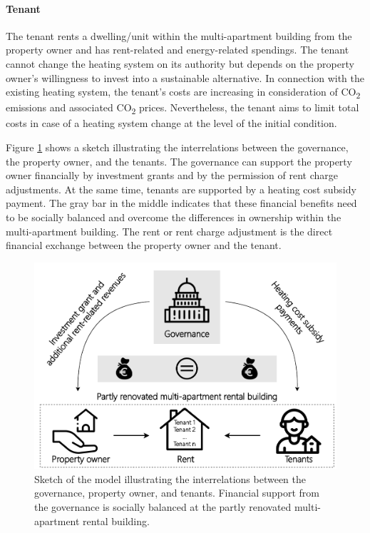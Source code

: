 \paragraph{Tenant} The tenant rents a dwelling/unit within the multi-apartment building from the property owner and has rent-related and energy-related spendings. The tenant cannot change the heating system on its authority but depends on the property owner's willingness to invest into a sustainable alternative. In connection with the existing heating system, the tenant's costs are increasing in consideration of CO\textsubscript{2} emissions and associated CO\textsubscript{2} prices. Nevertheless, the tenant aims to limit total costs in case of a heating system change at the level of the initial condition.\vspace{0.5cm}

Figure \ref{fig:methodology} shows a sketch illustrating the interrelations between the governance, the property owner, and the tenants. The governance can support the property owner financially by investment grants and by the permission of rent charge adjustments. At the same time, tenants are supported by a heating cost subsidy payment. The gray bar in the middle indicates that these financial benefits need to be socially balanced and overcome the differences in ownership within the multi-apartment building. The rent or rent charge adjustment is the direct financial exchange between the property owner and the tenant.\vspace{0.5cm}

\begin{figure}[h]
	\centering
	\includegraphics[width=0.7\linewidth]{figures/3_Methodology/Sketch.pdf}
	\caption{Sketch of the model illustrating the interrelations between the governance, property owner, and tenants. Financial support from the governance is socially balanced at the partly renovated multi-apartment rental building.}
	\label{fig:methodology}
\end{figure}

